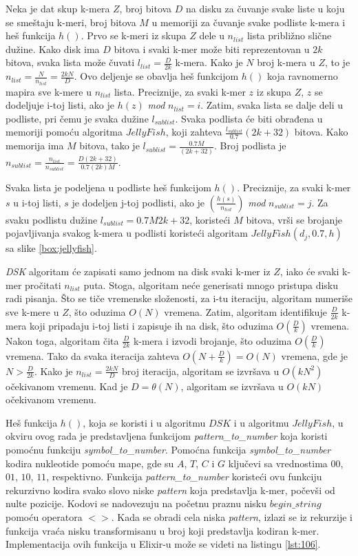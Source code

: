\documentclass[12pt,oneside]{memoir}
\begin{document}
Neka je dat skup k-mera $Z$, broj bitova $D$ na disku za čuvanje svake liste u koju se smeštaju k-meri, broj bitova $M$ u memoriji za čuvanje svake podliste k-mera i heš funkcija $h()$. Prvo se k-meri iz skupa $Z$ dele u $n_{list}$ lista približno slične dužine. Kako disk ima $D$ bitova i svaki k-mer može biti reprezentovan u $2k$ bitova, svaka lista može čuvati $l_{list} =  \frac{D}{2k}$ k-mera. Kako je $N$ broj k-mera u $Z$, to je $n_{list} = \frac{N}{n_{list}} = \frac{2kN}{D}$. Ovo deljenje se obavlja heš funkcijom $h()$ koja ravnomerno mapira sve k-mere u $n_{list}$ lista. Preciznije, za svaki k-mer $z$ iz skupa $Z$, $z$ se dodeljuje i-toj listi, ako je $h(z)$ \textit{mod} $n_{list} = i$. Zatim, svaka lista se dalje deli u podliste, pri čemu je svaka dužine $l_{sublist}$. Svaka podlista će biti obrađena u memoriji pomoću algoritma $JellyFish$, koji zahteva $\frac{l_{sublist}}{0.7}(2k +32)$ bitova. Kako memorija ima $M$ bitova, tako je $l_{sublist} = \frac{0.7M}{(2k + 32)}$. Broj podlista je  $n_{sublist} = \frac{n_{list}}{n_{sublist}} = \frac{D(2k + 32)}{0.7(2k)M}$. 

Svaka lista je podeljena u podliste heš funkcijom $h()$. Preciznije, za svaki k-mer $s$ u i-toj listi, $s$ je dodeljen j-toj podlisti, ako je $(\frac{h(s)}{n_{list}})$ \textit{mod} $n_{sublist} = j$. Za svaku podlistu dužine $l_{sublist} = {0.7M}{2k + 32}$, koristeći $M$ bitova,  vrši se brojanje pojavljivanja svakog k-mera u podlisti koristeći algoritam $JellyFish(d_j, 0.7, h)$ sa slike \ref{box:jellyfish}.

\textit{DSK} algoritam će zapisati samo jednom na disk svaki k-mer iz $Z$, iako će svaki k-mer pročitati $n_{list}$ puta. Stoga, algoritam neće generisati mnogo pristupa disku radi pisanja. Što se tiče vremenske složenosti, za i-tu iteraciju, algoritam numeriše sve k-mere u $Z$, što oduzima $O(N)$ vremena. Zatim, algoritam identifikuje $\frac{D}{2k}$ k-mera koji pripadaju i-toj listi i zapisuje ih na disk, što oduzima $O(\frac{D}{k})$ vremena. Nakon toga, algoritam  čita $\frac{D}{2k}$ k-mera i izvodi brojanje, što oduzima $O(\frac{D}{k})$ vremena. Tako da svaka iteracija zahteva $O(N + \frac{D}{k}) = O(N)$ vremena, gde je $N > \frac{D}{2k}$. Kako je $n_{list} = \frac{2kN}{D}$ broj iteracija, algoritam se izvršava u $O(kN^2)$ očekivanom vremenu. Kad je $D = \theta(N)$, algoritam se izvršava u $O(kN)$ očekivanom vremenu.

Heš funkcija $h()$, koja se koristi i u algoritmu $DSK$ i u algoritmu $JellyFish$, u okviru ovog rada je predstavljena funkcijom \textit{pattern\_to\_number} koja koristi pomoćnu funkciju \textit{symbol\_to\_number}. Pomoćna funkcija \textit{symbol\_to\_number} kodira nukleotide pomoću mape, gde su $A$, $T$, $C$ i $G$ ključevi sa vrednostima $00$, $01$, $10$, $11$, respektivno. Funkcija \textit{pattern\_to\_number} koristeći ovu funkciju rekurzivno kodira svako slovo niske \textit{pattern} koja predstavlja k-mer, počevši od nulte pozicije. Kodovi se nadovezuju na početnu praznu nisku $begin\_string$ pomoću operatora $<>$. Kada se obradi cela niska \textit{pattern}, izlazi se iz rekurzije i funkcija vraća nisku transformisanu u broj  koji predstavlja kodiran k-mer. Implementacija ovih funkcija u Elixir-u može se videti na listingu \ref{lst:106}.
\end{document}
